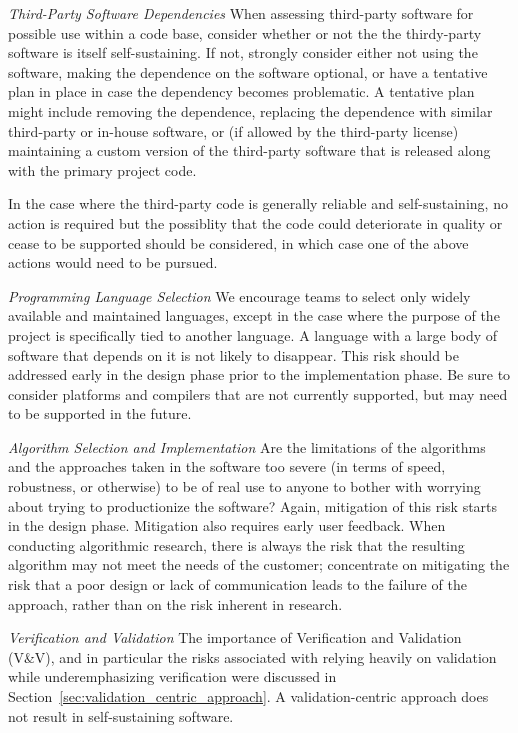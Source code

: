 \documentclass[11pt]{SANDreport}
\begin{document}
\textit{Third-Party Software Dependencies} When assessing third-party
software for possible use within a code base, consider whether or not the
the thirdy-party software is itself self-sustaining.  If not, strongly
consider either not using the software, making the dependence on the software
optional, or have a tentative plan in place in case the dependency becomes
problematic.  A tentative plan might include removing the dependence, replacing
the dependence with similar third-party or in-house software, or (if allowed by
the third-party license) maintaining a custom version of the third-party
software that is released along with the primary project code.

In the case where the
third-party code is generally reliable and self-sustaining, no action is
required but the possiblity that the code could deteriorate in quality or cease
to be supported should be considered, in which case one of the above actions
would need to be pursued.

\textit{Programming Language Selection} We encourage teams to select only widely
available and maintained languages, except in the case where the purpose of
the project is specifically tied to another language.  A language with a large
body of software that depends on it is not likely to disappear.  This risk
should be addressed early in the design phase prior to the implementation
phase.  Be sure to consider platforms and compilers that are not currently
supported, but may need to be supported in the future.

\textit{Algorithm Selection and Implementation} Are the limitations of the algorithms and the approaches taken
in the software too severe (in terms of speed, robustness, or otherwise) to be
of real use to anyone to bother with worrying about trying to productionize
the software?  Again, mitigation of
this risk starts in the design phase.  Mitigation also requires early user
feedback.  When conducting algorithmic research, there is always the risk that
the resulting algorithm may not meet the needs of the customer; concentrate
on mitigating the risk that a poor design or lack of communication leads to
the failure of the approach, rather than on the risk inherent in research.

\textit{Verification and Validation} The importance of Verification and
Validation (V\&V), and in particular the risks associated with relying heavily
on validation while underemphasizing verification were discussed in
Section~\ref{sec:validation_centric_approach}.  A validation-centric
approach does not result in self-sustaining software.
\end{document}
